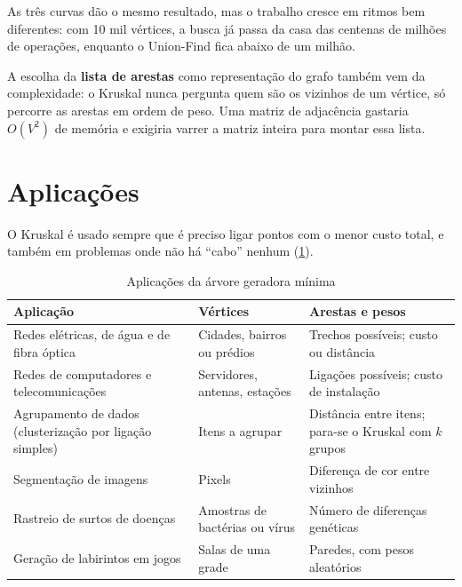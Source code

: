 \documentclass[a4paper]{article}
\newcommand{\fonte}[1]{\par\smallskip{\centering\footnotesize Fonte: #1\par}}
\begin{document}
As três curvas dão o mesmo resultado, mas o trabalho cresce em ritmos bem
diferentes: com 10 mil vértices, a busca já passa da casa das centenas de milhões
de operações, enquanto o Union-Find fica abaixo de um milhão.

A escolha da \textbf{lista de arestas} como representação do grafo também vem da
complexidade: o Kruskal nunca pergunta quem são os vizinhos de um vértice, só
percorre as arestas em ordem de peso. Uma matriz de adjacência gastaria $O(V^2)$
de memória e exigiria varrer a matriz inteira para montar essa lista.

\section{Aplicações}\label{sec:aplicacoes}
O Kruskal é usado sempre que é preciso ligar pontos com o menor custo total, e
também em problemas onde não há ``cabo'' nenhum (\cref{tab:aplicacoes}).

\begin{table}[H]
\centering
\caption{Aplicações da árvore geradora mínima}\label{tab:aplicacoes}
\small
\begin{tabularx}{\textwidth}{>{\raggedright\arraybackslash}X >{\raggedright\arraybackslash}X >{\raggedright\arraybackslash}X}
\toprule
Aplicação & Vértices & Arestas e pesos \\
\midrule
Redes elétricas, de água e de fibra óptica & Cidades, bairros ou prédios & Trechos possíveis; custo ou distância \\
Redes de computadores e telecomunicações & Servidores, antenas, estações & Ligações possíveis; custo de instalação \\
Agrupamento de dados (clusterização por ligação simples) & Itens a agrupar & Distância entre itens; para-se o Kruskal com $k$ grupos \\
Segmentação de imagens & Pixels & Diferença de cor entre vizinhos \\
Rastreio de surtos de doenças & Amostras de bactérias ou vírus & Número de diferenças genéticas \\
Geração de labirintos em jogos & Salas de uma grade & Paredes, com pesos aleatórios \\
\bottomrule
\end{tabularx}
\fonte{elaborada pelo autor (2026).}
\end{table}
\end{document}
